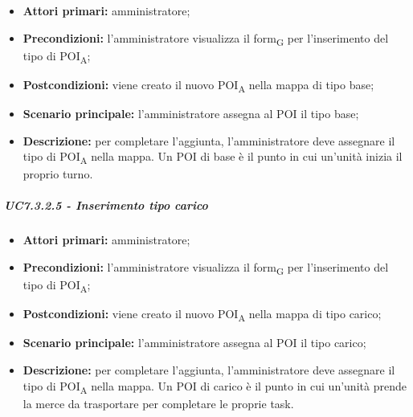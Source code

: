 \begin{itemize}

   \item   \textbf{Attori primari:} amministratore;

   \item   \textbf{Precondizioni:} l'amministratore visualizza il form\textsubscript{G} per l'inserimento del tipo di POI\textsubscript{A};

   \item   \textbf{Postcondizioni:} viene creato il nuovo POI\textsubscript{A} nella mappa di tipo base; 

   \item   \textbf{Scenario principale:} l'amministratore assegna al POI il tipo base;

   \item   \textbf{Descrizione:} per completare l'aggiunta, l'amministratore deve assegnare il tipo di POI\textsubscript{A} nella mappa. Un POI di base è il punto in cui un'unità inizia il proprio turno.



\end{itemize}



\subparagraph{UC7.3.2.5 - Inserimento tipo carico}

\begin{itemize}

   \item   \textbf{Attori primari:} amministratore;

   \item   \textbf{Precondizioni:} l'amministratore visualizza il form\textsubscript{G} per l'inserimento del tipo di POI\textsubscript{A};

   \item   \textbf{Postcondizioni:} viene creato il nuovo POI\textsubscript{A} nella mappa di tipo carico; 

 \item   \textbf{Scenario principale:} l'amministratore assegna al POI il tipo carico;

   \item   \textbf{Descrizione:} per completare l'aggiunta, l'amministratore deve assegnare il tipo di POI\textsubscript{A} nella mappa. Un POI di carico è il punto in cui un'unità prende la merce da trasportare per completare le proprie task.



\end{itemize}



